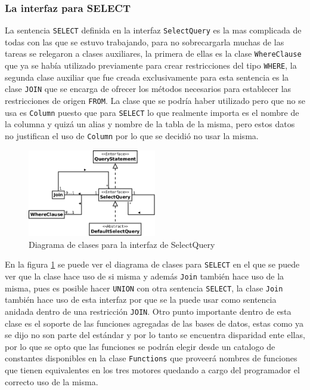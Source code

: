 \subsubsection{La interfaz para SELECT}
La sentencia \verb=SELECT= definida en la interfaz \verb=SelectQuery= es la mas complicada de todas con las que se estuvo trabajando, para no sobrecargarla muchas de las tareas se relegaron  a clases auxiliares, la primera de ellas es la clase \verb=WhereClause= que ya se había utilizado previamente para crear restricciones del tipo \verb=WHERE=, la segunda clase auxiliar que fue creada exclusivamente para esta sentencia es la clase \verb=JOIN= que se encarga de ofrecer los métodos necesarios para establecer las restricciones de origen \verb=FROM=. La clase que se podría haber utilizado pero que no se usa es \verb=Column= puesto que para \verb=SELECT= lo que realmente importa es el nombre de la columna y quizá un alias y nombre de la tabla de la misma, pero estos datos no justifican el uso de \verb=Column= por lo que se decidió no usar la misma.
%
\begin{figure}
  \centering
    \includegraphics[width=0.5\textwidth]{figuras/jdbgm-dc-select.png}
  \caption{Diagrama de clases para la interfaz de SelectQuery}
  \label{fig:dc-selectquery}
\end{figure}

En la figura \ref{fig:dc-selectquery} se puede ver el diagrama de clases para \verb=SELECT= en el que se puede ver que la clase hace uso de si misma y además \verb=Join= también hace uso de la misma, pues es posible hacer \verb=UNION= con otra sentencia \verb=SELECT=, la clase \verb=Join= también hace uso de esta interfaz por que se la puede usar como sentencia anidada dentro de una restricción \verb=JOIN=. Otro punto importante dentro de esta clase es el soporte de las funciones agregadas de las bases de datos, estas como ya se dijo no son parte del estándar y por lo tanto se encuentra disparidad ente ellas, por lo que se opto que las funciones se podrán elegir desde un catalogo de constantes disponibles en la clase \verb=Functions= que proveerá nombres de funciones que tienen equivalentes en los tres motores quedando a cargo del programador el correcto uso de la misma.
%

